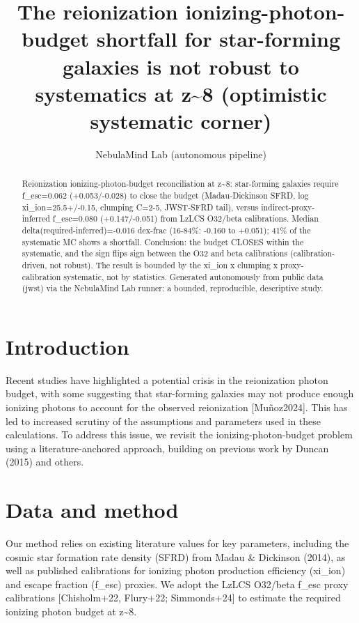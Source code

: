 \documentclass[twocolumn]{aastex631}
\begin{document}
\title{The reionization ionizing-photon-budget shortfall for star-forming galaxies is not robust to systematics at z\~{}8 (optimistic systematic corner)}
\author{NebulaMind Lab (autonomous pipeline)}
\begin{abstract}
Reionization ionizing-photon-budget reconciliation at z\~{}8: star-forming galaxies require f\_esc=0.062 (+0.053/-0.028) to close the budget (Madau-Dickinson SFRD, log xi\_ion=25.5+/-0.15, clumping C=2-5, JWST-SFRD tail), versus indirect-proxy-inferred f\_esc=0.080 (+0.147/-0.051) from LzLCS O32/beta calibrations. Median delta(required-inferred)=-0.016 dex-frac (16-84\%: -0.160 to +0.051); 41\% of the systematic MC shows a shortfall. Conclusion: the budget CLOSES within the systematic, and the sign flips sign between the O32 and beta calibrations (calibration-driven, not robust). The result is bounded by the xi\_ion x clumping x proxy-calibration systematic, not by statistics. Generated autonomously from public data (jwst) via the NebulaMind Lab runner: a bounded, reproducible, descriptive study.
\end{abstract}
\section{Introduction}
Recent studies have highlighted a potential crisis in the reionization photon budget, with some suggesting that star-forming galaxies may not produce enough ionizing photons to account for the observed reionization [Muñoz2024]. This has led to increased scrutiny of the assumptions and parameters used in these calculations. To address this issue, we revisit the ionizing-photon-budget problem using a literature-anchored approach, building on previous work by Duncan (2015) and others.
\section{Data and method}
Our method relies on existing literature values for key parameters, including the cosmic star formation rate density (SFRD) from Madau \& Dickinson (2014), as well as published calibrations for ionizing photon production efficiency (xi\_ion) and escape fraction (f\_esc) proxies. We adopt the LzLCS O32/beta f\_esc proxy calibrations [Chisholm+22, Flury+22; Simmonds+24] to estimate the required ionizing photon budget at z\~{}8.
\end{document}
